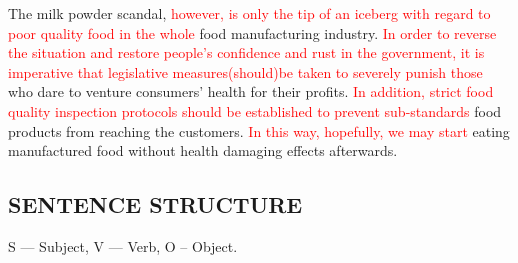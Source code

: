 \documentclass{article}
\begin{document}
\par The milk powder scandal, \textcolor{red}{however, is only the tip of an iceberg with
  regard to poor quality food in the whole} food manufacturing
industry. \textcolor{red}{In order to reverse the situation and restore people's
  confidence and rust in the government, it is imperative that legislative
  measures(should)be taken to severely punish those} who dare to venture consumers' health
for their profits. \textcolor{red}{In addition, strict food quality inspection protocols
  should be established to prevent sub-standards} food products from reaching the
customers. \textcolor{red}{In this way, hopefully, we may start} eating manufactured food
without health damaging effects afterwards.


\begin{center}
  \section{SENTENCE STRUCTURE}
\end{center}
\label{sec:sentence}
S --- Subject, V --- Verb, O -- Object.
\end{document}
